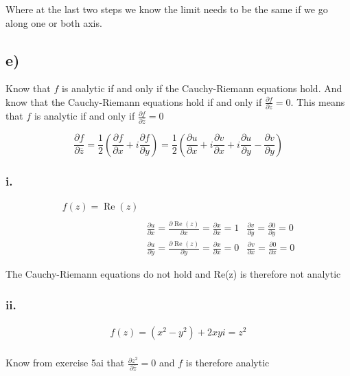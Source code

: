 \documentclass{article}
\begin{document}
Where at the last two steps we know the limit needs to be the same if we go along one or both axis.

\subsection*{e)}

Know that $f$ is analytic if and only if the Cauchy-Riemann equations hold. And know that the Cauchy-Riemann equations hold if and only if $\frac{\partial f}{\partial \overline{z}} = 0$. This means that $f$ is analytic if and only if $\frac{\partial f}{\partial \overline{z}} = 0$

\[\frac{\partial f}{\partial \overline{z}} = \frac{1}{2}\left(\frac{\partial f}{\partial x} + i\frac{\partial f}{\partial y}\right) = \frac{1}{2}\left(\frac{\partial u}{\partial x} + i\frac{\partial v}{\partial x} + i\frac{\partial u}{\partial y} - \frac{\partial v}{\partial y}\right) \]
  \subsubsection*{i.}

  \begin{align*}
    f(z) = \operatorname{Re}(z)\\
    \ \\
    &\frac{\partial u}{\partial x} = \frac{\partial \operatorname{Re}(z)}{\partial x} = \frac{\partial x}{\partial x} = 1
    & \frac{\partial v}{\partial y} = \frac{\partial 0}{\partial y} = 0
    \\
    &\frac{\partial u}{\partial y} = \frac{\partial \operatorname{Re}(z)}{\partial y}  = \frac{\partial x}{\partial x} = 0
    & \frac{\partial v}{\partial x} = \frac{\partial 0}{\partial x} = 0
  \end{align*}
    
  The Cauchy-Riemann equations do not hold and Re(z) is therefore not analytic

  \subsubsection*{ii.}
  \begin{align*}
    f(z) = (x^2 - y^2)+ 2xyi = z^2\\
  \end{align*}

  Know from exercise 5ai that $\frac{\partial z^2}{\partial \overline{z}} = 0$ and $f$ is therefore analytic 
\end{document}
